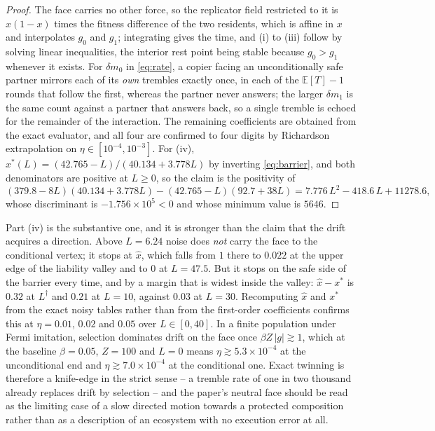 \documentclass[11pt,a4paper]{article}
\theoremstyle{definition}
\begin{document}
\begin{proof}
The face carries no other force, so the replicator field restricted to it is
$x(1-x)$ times the fitness difference of the two residents, which is affine in
$x$ and interpolates $g_{0}$ and $g_{1}$; integrating gives the time, and (i)
to (iii) follow by solving linear inequalities, the interior rest point being
stable because $g_{0}>g_{1}$ whenever it exists. For $\delta m_{0}$ in
\eqref{eq:rate}, a copier facing an unconditionally safe partner mirrors each
of its \emph{own} trembles exactly once, in each of the $\mathbb{E}[T]-1$
rounds that follow the first, whereas the partner never answers; the larger
$\delta m_{1}$ is the same count against a partner that answers back, so a
single tremble is echoed for the remainder of the interaction. The remaining
coefficients are obtained from the exact evaluator, and all four are confirmed
to four digits by Richardson extrapolation on $\eta\in[10^{-4},10^{-3}]$. For
(iv), $x^{*}(L)=(42.765-L)/(40.134+3.778L)$ by inverting \eqref{eq:barrier},
and both denominators are positive at $L\ge0$, so the claim is the positivity
of
\begin{equation}
(379.8-8L)(40.134+3.778L)-(42.765-L)(92.7+38L)
  =7.776\,L^{2}-418.6\,L+11278.6,
\label{eq:margin}
\end{equation}
whose discriminant is $-1.756\times10^{5}<0$ and whose minimum value is
$5646$.
\end{proof}

Part (iv) is the substantive one, and it is stronger than the claim that the
drift acquires a direction. Above $L=6.24$ noise does \emph{not} carry the
face to the conditional vertex; it stops at $\hat x$, which falls from $1$
there to $0.022$ at the upper edge of the liability valley and to $0$ at
$L=47.5$. But it stops on the safe side of the barrier every time, and by a
margin that is widest inside the valley: $\hat x-x^{*}$ is $0.32$ at
$L^{\dagger}$ and $0.21$ at $L=10$, against $0.03$ at $L=30$. Recomputing
$\hat x$ and $x^{*}$ from the exact noisy tables rather than from the
first-order coefficients confirms this at $\eta=0.01$, $0.02$ and $0.05$ over
$L\in[0,40]$. In a finite population under Fermi imitation, selection
dominates drift on the face once $\beta Z\,|g|\gtrsim1$, which at the baseline
$\beta=0.05$, $Z=100$ and $L=0$ means $\eta\gtrsim5.3\times10^{-4}$ at the
unconditional end and $\eta\gtrsim7.0\times10^{-4}$ at the conditional one.
Exact twinning is therefore a knife-edge in the strict sense -- a tremble rate
of one in two thousand already replaces drift by selection -- and the paper's
neutral face should be read as the limiting case of a slow directed motion
towards a protected composition rather than as a description of an ecosystem
with no execution error at all.
\end{document}
